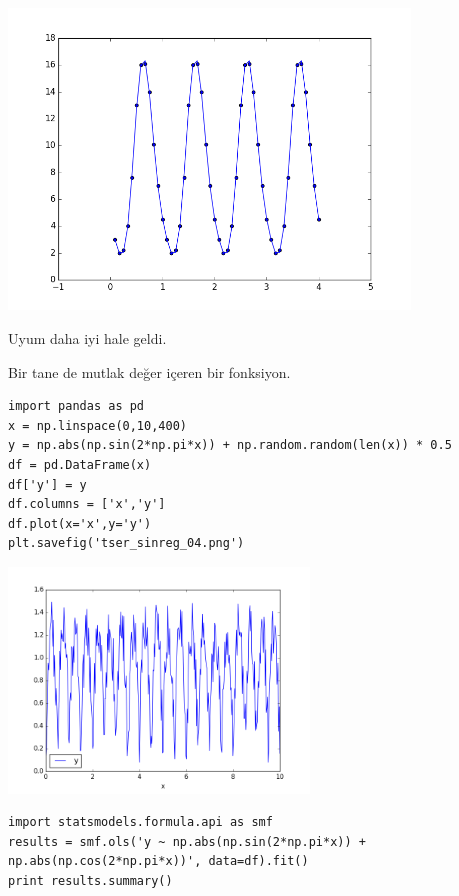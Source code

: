 \documentclass[12pt,fleqn]{article}\usepackage{../../common}
\begin{document}
\includegraphics[height=8cm]{tser_sinreg_03.png}

Uyum daha iyi hale geldi.

Bir tane de mutlak değer içeren bir fonksiyon.

\begin{verbatim}
import pandas as pd
x = np.linspace(0,10,400)
y = np.abs(np.sin(2*np.pi*x)) + np.random.random(len(x)) * 0.5
df = pd.DataFrame(x)
df['y'] = y
df.columns = ['x','y']
df.plot(x='x',y='y')
plt.savefig('tser_sinreg_04.png')
\end{verbatim}

\includegraphics[height=6cm]{tser_sinreg_04.png}

\begin{verbatim}
import statsmodels.formula.api as smf
results = smf.ols('y ~ np.abs(np.sin(2*np.pi*x)) + np.abs(np.cos(2*np.pi*x))', data=df).fit()
print results.summary()
\end{verbatim}
\end{document}
